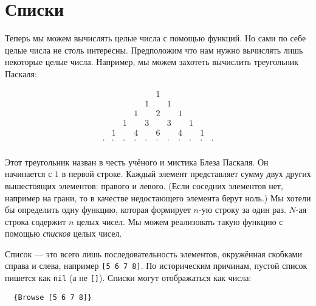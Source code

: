 \section{Списки}

Теперь мы можем вычислять целые числа с помощью функций. Но сами по себе целые числа не столь интересны. Предположим что нам нужно вычислять лишь некоторые целые числа. Например, мы можем захотеть вычислить треугольник Паскаля:

$$
\begin{array}{ccccccccccc}
  & & & & &1& & & & & \\
  & & & &1& &1& & & & \\
  & & &1& &2& &1& & & \\
  & &1& &3& &3& &1& & \\
  &1& &4& &6& &4& &1& \\
 \cdot&\cdot&\cdot&\cdot&\cdot&\cdot&\cdot&\cdot&\cdot&\cdot&\cdot \\
  \end{array}
$$

\newcommand\somenewcommand{\draw (0, 0) -- (1, 1);}

\newcommand\consgraph[3]{
  \draw (#1, #2) -- (#1, #2 - 0.5);
  \draw [->] (#1, #2 - 0.5) -- (#1 - 0.5, #2 - 1.5) node [below] {#3};
  \draw [->] (#1, #2 - 0.5) -- (#1 + 0.5, #2 - 1.5);
  \node [below left] at (#1, #2 - 0.9) {\tiny{1}};
  \node [below right] at (#1, #2 - 0.9) {\tiny{2}};
}




Этот треугольник назван в честь учёного и мистика Блеза Паскаля. Он начинается с $1$ в первой строке. Каждый элемент представляет сумму двух других вышестоящих элементов: правого и левого. (Если соседних элементов нет, например на грани, то в качестве недостающего элемента берут ноль.) Мы хотели бы определить одну функцию, которая формирует $n$-ую строку за один раз. $N$-ая строка содержит $n$ целых чисел. Мы можем реализовать такую функцию с помощью \emph{списков} целых чисел.



Список --- это всего лишь последовательность элементов, окружённая скобками справа и слева, например \lstinline|[5 6 7 8]|. По историческим причинам, пустой список пишется как \lstinline|nil| (а не \lstinline|[]|). Списки могут отображаться как числа:

\begin{lstlisting}
  {Browse [5 6 7 8]}
\end{lstlisting}

